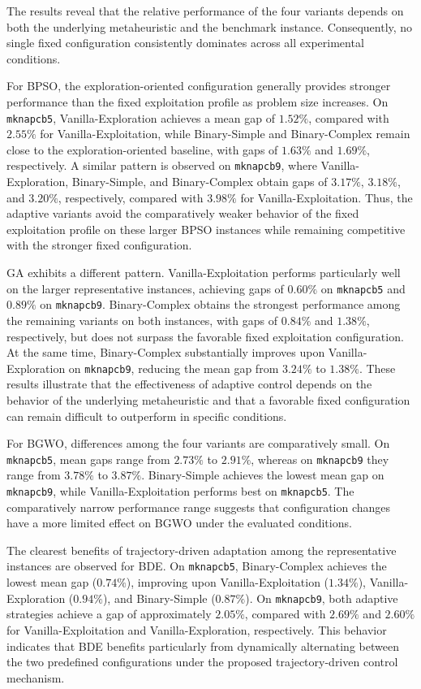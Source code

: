 \documentclass[journal,article,submit,moreauthors]{Definitions/mdpi}
\begin{document}
The results reveal that the relative performance of the four variants depends
on both the underlying metaheuristic and the benchmark instance. Consequently,
no single fixed configuration consistently dominates across all experimental
conditions.

For BPSO, the exploration-oriented configuration generally provides stronger
performance than the fixed exploitation profile as problem size increases.
On \texttt{mknapcb5}, Vanilla-Exploration achieves a mean gap of $1.52\%$,
compared with $2.55\%$ for Vanilla-Exploitation, while Binary-Simple and
Binary-Complex remain close to the exploration-oriented baseline, with gaps
of $1.63\%$ and $1.69\%$, respectively. A similar pattern is observed on
\texttt{mknapcb9}, where Vanilla-Exploration, Binary-Simple, and
Binary-Complex obtain gaps of $3.17\%$, $3.18\%$, and $3.20\%$,
respectively, compared with $3.98\%$ for Vanilla-Exploitation. Thus, the
adaptive variants avoid the comparatively weaker behavior of the fixed
exploitation profile on these larger BPSO instances while remaining
competitive with the stronger fixed configuration.

GA exhibits a different pattern. Vanilla-Exploitation performs particularly
well on the larger representative instances, achieving gaps of $0.60\%$ on
\texttt{mknapcb5} and $0.89\%$ on \texttt{mknapcb9}. Binary-Complex obtains
the strongest performance among the remaining variants on both instances,
with gaps of $0.84\%$ and $1.38\%$, respectively, but does not surpass the
favorable fixed exploitation configuration. At the same time, Binary-Complex
substantially improves upon Vanilla-Exploration on \texttt{mknapcb9},
reducing the mean gap from $3.24\%$ to $1.38\%$. These results illustrate
that the effectiveness of adaptive control depends on the behavior of the
underlying metaheuristic and that a favorable fixed configuration can remain
difficult to outperform in specific conditions.

For BGWO, differences among the four variants are comparatively small.
On \texttt{mknapcb5}, mean gaps range from $2.73\%$ to $2.91\%$, whereas
on \texttt{mknapcb9} they range from $3.78\%$ to $3.87\%$. Binary-Simple
achieves the lowest mean gap on \texttt{mknapcb9}, while
Vanilla-Exploitation performs best on \texttt{mknapcb5}. The comparatively
narrow performance range suggests that configuration changes have a more
limited effect on BGWO under the evaluated conditions.

The clearest benefits of trajectory-driven adaptation among the
representative instances are observed for BDE. On \texttt{mknapcb5},
Binary-Complex achieves the lowest mean gap ($0.74\%$), improving upon
Vanilla-Exploitation ($1.34\%$), Vanilla-Exploration ($0.94\%$), and
Binary-Simple ($0.87\%$). On \texttt{mknapcb9}, both adaptive strategies
achieve a gap of approximately $2.05\%$, compared with $2.69\%$ and
$2.60\%$ for Vanilla-Exploitation and Vanilla-Exploration, respectively.
This behavior indicates that BDE benefits particularly from dynamically
alternating between the two predefined configurations under the proposed
trajectory-driven control mechanism.
\end{document}
